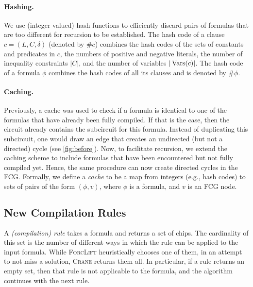 \paragraph*{Hashing.}
We use (integer-valued) hash functions to efficiently discard pairs of formulas
that are too different for recursion to be established. The hash code of a
clause $c = (L, C, \delta)$ (denoted by $\# c$) combines the hash codes of the
sets of constants and predicates in $c$, the numbers of positive and negative
literals, the number of inequality constraints $|C|$, and the number of
variables $|\operatorname{Vars}(c)|$. The hash code of a formula $\phi$ combines the hash
codes of all its clauses and is denoted by $\#\phi$.

\paragraph*{Caching.}
Previously, a cache was used to check if a formula is identical to one of the
formulas that have already been fully compiled. If that is the case, then the
circuit already contains the subcircuit for this formula. Instead of duplicating
this subcircuit, one would draw an edge that creates an undirected (but not a
directed) cycle (see \cref{fig:before}). Now, to facilitate recursion, we extend
the caching scheme to include formulas that have been encountered but not fully
compiled yet. Hence, the same procedure can now create directed cycles in the
FCG\@. Formally, we define a \emph{cache} to be a map from integers (e.g., hash
codes) to sets of pairs of the form $(\phi, v)$, where $\phi$ is a formula, and
$v$ is an FCG node.

\subsection{New Compilation Rules}\label{sec:rules}

A \emph{(compilation) rule} takes a formula and returns a set of chips. The
cardinality of this set is the number of different ways in which the rule can be
applied to the input formula. While \textsc{ForcLift}
\citep{DBLP:conf/ijcai/BroeckTMDR11} heuristically chooses one of them, in an
attempt to not miss a solution, \textsc{Crane} returns them all. In particular,
if a rule returns an empty set, then that rule is not applicable to the formula,
and the algorithm continues with the next rule.

